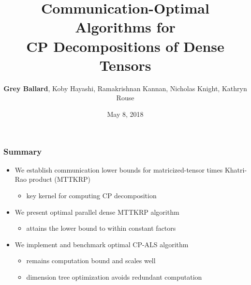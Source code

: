 \documentclass[xcolor=dvipsnames]{beamer}
\begin{document}
\title{Communication-Optimal Algorithms for \\ CP Decompositions of Dense Tensors}
\author[Ballard]{\textbf{Grey Ballard}, Koby Hayashi, Ramakrishnan Kannan, Nicholas Knight, Kathryn Rouse}
\date{May 8, 2018}
\begin{frame}[label=title,plain]
\maketitle
\end{frame}
\addtocounter{framenumber}{-1}

\begin{frame}[label=summary]
\frametitle{Summary}

\begin{itemize}
	\item We establish communication lower bounds for matricized-tensor times Khatri-Rao product (MTTKRP)
	\begin{itemize}
		\item key kernel for computing CP decomposition
	\end{itemize}
	\vfill
	\item We present optimal parallel dense MTTKRP algorithm
	\begin{itemize}
		\item attains the lower bound to within constant factors
	\end{itemize}
	\vfill
	\item We implement and benchmark optimal CP-ALS algorithm
	\begin{itemize}
		\item remains computation bound and scales well
		\item dimension tree optimization avoids redundant computation
	\end{itemize}
\end{itemize}

\end{frame}
\end{document}
